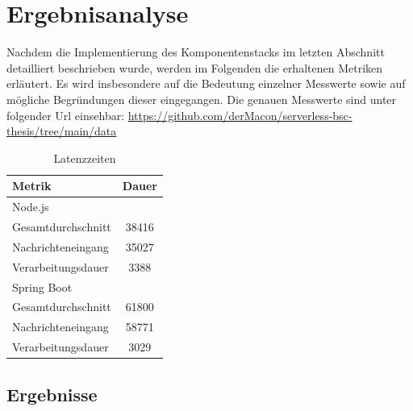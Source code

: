 \chapter{Ergebnisanalyse}
\label{ch:ergebnisanalyse}

Nachdem die Implementierung des Komponentenstacks im letzten Abschnitt detailliert beschrieben wurde, werden im Folgenden die erhaltenen Metriken erläutert. Es wird insbesondere auf die Bedeutung einzelner Messwerte sowie auf mögliche Begründungen dieser eingegangen. Die genauen Messwerte sind unter folgender Url einsehbar: \url{https://github.com/derMacon/serverless-bsc-thesis/tree/main/data}

\label{tab:latency}
\begin{table}[ht!]
  \centering
  \begin{tabular}{@{}lc@{}}
    \toprule
    Metrik & Dauer \\
    \midrule
    Node.js \\
    \hspace{3mm}Gesamtdurchschnitt & 38416 \\
    \hspace{3mm}Nachrichteneingang & 35027 \\
    \hspace{3mm}Verarbeitungsdauer & 3388 \\
    \midrule
    Spring Boot \\
    \hspace{3mm}Gesamtdurchschnitt & 61800 \\
    \hspace{3mm}Nachrichteneingang & 58771 \\
    \hspace{3mm}Verarbeitungsdauer & 3029 \\
    \bottomrule
  \end{tabular}
  \caption[Latenzzeit - Vergleich]{Latenzzeiten}
\end{table} 

\section{Ergebnisse}



